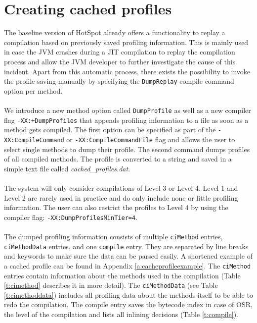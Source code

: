 \section{Creating cached profiles}
\label{s:creatingprofiles}
The baseline version of HotSpot already offers a functionality to replay a compilation based on previously saved profiling information.
This is mainly used in case the JVM crashes during a JIT compilation to replay the compilation process and allow the JVM developer to further investigate the cause of this incident.
Apart from this automatic process, there exists the possibility to invoke the profile saving manually by specifying the \texttt{DumpReplay} compile command option per method.
\\\\
We introduce a new method option called \texttt{DumpProfile} as well as a new compiler flag \newline\texttt{-XX:+DumpProfiles} that appends profiling information to a file as soon as a method gets compiled. The first option can be specified as part of the \texttt{-XX:CompileCommand} or \texttt{-XX:CompileCommandFile} flag and allows the user to select single methods to dump their profile. The second command dumps profiles of all compiled methods.
The profile is converted to a string and saved in a simple text file called \textit{cached\_profiles.dat}.
\\\\
The system will only consider compilations of Level 3 or Level 4. Level 1 and Level 2 are rarely used in practice and do only include none or little profiling information. The user can also restrict the profiles to Level 4 by using the compiler flag: \texttt{-XX:DumpProfilesMinTier=4}.
\\\\
The dumped profiling information consists of multiple \texttt{ciMethod} entries, \texttt{ciMethodData} entries, and one \texttt{compile} entry. They are separated by line breaks and keywords to make sure the data can be parsed easily. A shortened example of a cached profile can be found in Appendix \ref{a:cacheprofileexample}. The \texttt{ciMethod} entries contain information about the methods used in the compilation (Table \ref{t:cimethod} describes it in more detail). The \texttt{ciMethodData} (see Table \ref{t:cimethoddata}) includes all profiling data about the methods itself to be able to redo the compilation.
The compile entry saves the bytecode index in case of OSR, the level of the compilation and lists all inlining decisions (Table \ref{t:compile}).
